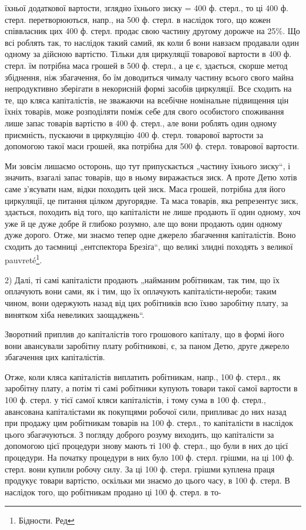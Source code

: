 їхньої додаткової вартости, зглядно їхнього зиску = 400 ф. стерл., то
ці 400 ф. стерл. перетворюються, напр., на 500 ф. стерл. в наслідок
того, що кожен співвласник цих 400 ф. стерл. продає свою частину другому
дорожче на 25\%. Що всі роблять так, то наслідок такий самий,
як коли б вони навзаєм продавали один одному за дійсною вартістю.
Тільки для циркуляції товарової вартости в 400 ф. стерл. їм потрібна
маса грошей в 500 ф. стерл., а це є, здається, скорше метод збіднення,
ніж збагачення, бо їм доводиться чималу частину всього свого майна
непродуктивно зберігати в некорисній формі засобів циркуляції. Все
сходить на те, що кляса капіталістів, не зважаючи на всебічне номінальне
підвищення цін їхніх товарів, може розподіляти поміж себе для свого
особистого споживання лише запас товарів вартістю в 400 ф.
стерл., але вони роблять один одному приємність, пускаючи в циркуляцію
400 ф. стерл. товарової вартости за допомогою такої маси грошей,
яка потрібна для 500 ф. стерл. товарової вартости.

Ми зовсім лишаємо осторонь, що тут припускається „частину їхнього
зиску“, і значить, взагалі запас товарів, що в ньому виражається зиск.
А проте Детю хотів саме з’ясувати нам, відки походить цей зиск. Маса
грошей, потрібна для його циркуляції, це питання цілком другорядне. Та маса
товарів, яка репрезентує зиск, здається, походить від того, що капіталісти
не лише продають її один одному, хоч уже й це дуже добре й
глибоко розумно, але що вони продають один одному дуже дорого.
Отже, ми знаємо тепер одне джерело збагачення капіталістів. Воно сходить
до таємниці „ентспектора Брезіґа“, що великі злидні походять з великої
pauvreté\footnote*{
Бідности. Ред
}.

2) Далі, ті самі капіталісти продають „найманим робітникам, так тим,
що їх оплачують вони сами, як і тим, що їх оплачують капіталісти-нероби;
таким чином, вони одержують назад від цих робітників всю їхню заробітну
плату, за винятком хіба невеликих заощаджень“.

Зворотний приплив до капіталістів того грошового капіталу, що
в формі його вони авансували заробітну плату робітникові, є, за паном
Детю, друге джерело збагачення цих капіталістів.

Отже, коли кляса капіталістів виплатить робітникам, напр., 100 ф. стерл.,
як заробітну плату, а потім ті самі робітники купують товари такої самої
вартости в 100 ф. стерл. у тієї самої кляси капіталістів, і тому сума
в 100 ф. стерл., авансована капіталістами як покупцями робочої сили,
припливає до них назад при продажу цим робітникам товарів на 100 ф.
стерл., то капіталісти в наслідок цього збагачуються. З погляду
доброго розуму виходить, що капіталісти за допомогою цієї процедури
знову мають ті 100 ф. стерл., що були в них до цієї процедури. На
початку процедури в них було 100 ф. стерл. грішми, на ці 100 ф. стерл.
вони купили робочу силу. За ці 100 ф. стерл. грішми куплена праця
продукує товари вартістю, оскільки ми знаємо до цього часу, в 100 ф.
стерл. В наслідок того, що робітникам продано ці 100 ф. стерл. в то-
